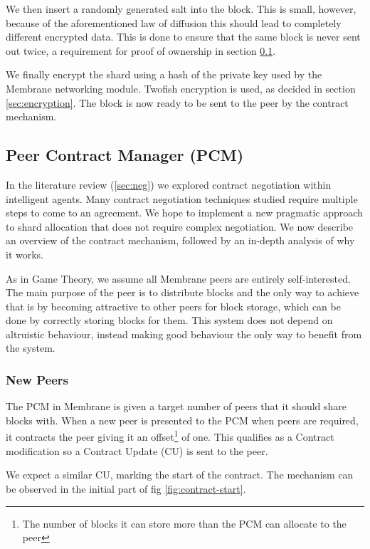 \documentclass[11pt, a4paper, twoside]{report}
\begin{document}
We then insert a randomly generated salt into the block. This is small, however, because of the aforementioned law of diffusion \citep{shannon1945mathematical} this should lead to completely different encrypted data. This is done to ensure that the same block is never sent out twice, a requirement for proof of ownership in section \ref{sec:contractMech}.

We finally encrypt the shard using a hash of the private key used by the Membrane networking module. Twofish encryption is used, as decided in section \ref{sec:encryption}. The block is now ready to be sent to the peer by the contract mechanism.


\subsection{Peer Contract Manager (PCM)} \label{sec:contractMech}

In the literature review (\ref{sec:neg}) we explored contract negotiation within intelligent agents. Many contract negotiation techniques studied require multiple steps to come to an agreement. We hope to implement a new pragmatic approach to shard allocation that does not require complex negotiation. We now describe an overview of the contract mechanism, followed by an in-depth analysis of why it works.

As in Game Theory, we assume all Membrane peers are entirely self-interested. The main purpose of the peer is to distribute blocks and the only way to achieve that is by becoming attractive to other peers for block storage, which can be done by correctly storing blocks for them. This system does not depend on altruistic behaviour, instead making good behaviour the only way to benefit from the system.

\subsubsection{New Peers}

The PCM in Membrane is given a target number of peers that it should share blocks with. When a new peer is presented to the PCM when peers are required, it contracts the peer giving it an offset\footnote{The number of blocks it can store more than the PCM can allocate to the peer} of one. This qualifies as a Contract modification so a Contract Update (CU) is sent to the peer.

We expect a similar CU, marking the start of the contract. The mechanism can be observed in the initial part of fig \ref{fig:contract-start}.
\end{document}
